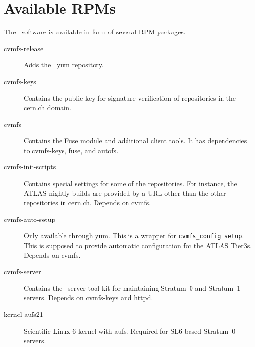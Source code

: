 \chapter{Available RPMs}
\label{apx:rpms}

The \cvmfs\ software is available in form of several RPM packages:
\begin{description}
	\item[cvmfs-release] Adds the \cvmfs\ yum repository.
	\item[cvmfs-keys] Contains the public key for signature verification of repositories in the cern.ch domain.
	\item[cvmfs] Contains the Fuse module and additional client tools.  It has dependencies to cvmfs-keys, fuse, and autofs.
	\item[cvmfs-init-scripts] Contains special settings for some of the repositories.
		For instance, the ATLAS nightly builds are provided by a URL other than the other repositories in cern.ch.
		Depends on cvmfs.
	\item[cvmfs-auto-setup] Only available through yum. 
		This is a wrapper for \texttt{cvmfs\_config setup}. 
		This is supposed to provide automatic configuration for the ATLAS Tier3s.
		Depends on cvmfs.
	\item[cvmfs-server] Contains the \cvmfs\ server tool kit for maintaining Stratum~0 and Stratum~1 servers.
		Depends on cvmfs-keys and httpd.
	\item[kernel-aufs21-$\cdots$] Scientific Linux 6 kernel with aufs.
		Required for SL6 based Stratum~0 servers.
\end{description}
